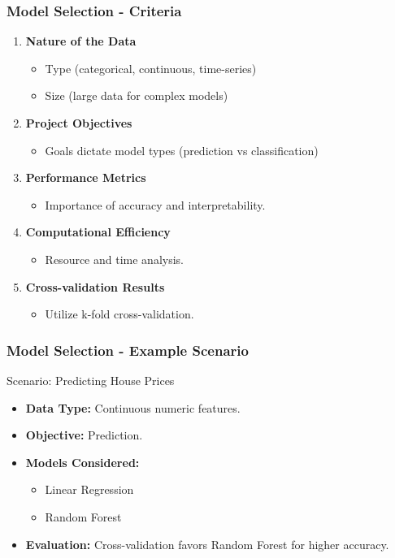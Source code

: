 \documentclass[aspectratio=169]{beamer}
\begin{document}
\begin{frame}[fragile]
    \frametitle{Model Selection - Criteria}
    \begin{enumerate}
        \item \textbf{Nature of the Data}
            \begin{itemize}
                \item Type (categorical, continuous, time-series)
                \item Size (large data for complex models)
            \end{itemize}
        \item \textbf{Project Objectives}
            \begin{itemize}
                \item Goals dictate model types (prediction vs classification)
            \end{itemize}
        \item \textbf{Performance Metrics}
            \begin{itemize}
                \item Importance of accuracy and interpretability.
            \end{itemize}
        \item \textbf{Computational Efficiency}
            \begin{itemize}
                \item Resource and time analysis.
            \end{itemize}
        \item \textbf{Cross-validation Results}
            \begin{itemize}
                \item Utilize k-fold cross-validation.
            \end{itemize}
    \end{enumerate}
\end{frame}

\begin{frame}[fragile]
    \frametitle{Model Selection - Example Scenario}
    \begin{block}{Scenario: Predicting House Prices}
        \begin{itemize}
            \item \textbf{Data Type:} Continuous numeric features.
            \item \textbf{Objective:} Prediction.
            \item \textbf{Models Considered:} 
                \begin{itemize}
                    \item Linear Regression
                    \item Random Forest
                \end{itemize}
            \item \textbf{Evaluation:} Cross-validation favors Random Forest for higher accuracy.
        \end{itemize}
    \end{block}
\end{frame}
\end{document}
